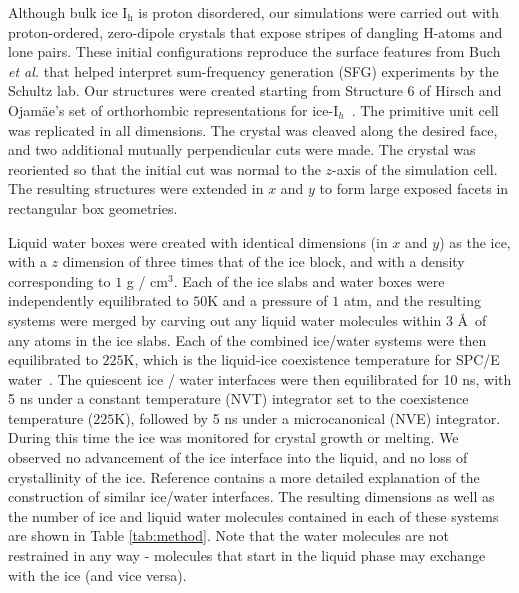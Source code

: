 Although bulk ice I$_\mathrm{h}$ is proton disordered, our simulations
were carried out with proton-ordered, zero-dipole crystals that expose
stripes of dangling H-atoms and lone pairs.  These initial
configurations reproduce the surface features from Buch \textit{et
  al.}\cite{Buch2008} that helped interpret sum-frequency generation
(SFG) experiments by the Schultz lab.\cite{Groenzin07} Our structures were
created starting from Structure 6 of Hirsch and Ojam\"{a}e's set of
orthorhombic representations for ice-I$_{h}$~\cite{Hirsch2004}. The
primitive unit cell was replicated in all dimensions. The crystal was
cleaved along the desired face, and two additional mutually
perpendicular cuts were made.  The crystal was reoriented so that the
initial cut was normal to the $z$-axis of the simulation cell.  The
resulting structures were extended in $x$ and $y$ to form large
exposed facets in rectangular box geometries.

Liquid water boxes were created with identical dimensions (in $x$ and
$y$) as the ice, with a $z$ dimension of three times that of the ice
block, and with a density corresponding to $1$ g / cm$^3$.  Each of
the ice slabs and water boxes were independently equilibrated to $50$K
and a pressure of $1$ atm, and the resulting systems were merged by
carving out any liquid water molecules within 3 \AA\ of any atoms in
the ice slabs.  Each of the combined ice/water systems were then
equilibrated to $225$K, which is the liquid-ice coexistence
temperature for SPC/E water~\cite{Bryk2002}. The quiescent ice / water
interfaces were then equilibrated for 10 ns, with 5 ns under a
constant temperature (NVT) integrator set to the coexistence
temperature ($225$K), followed by 5 ns under a microcanonical (NVE)
integrator.  During this time the ice was monitored for crystal growth
or melting. We observed no advancement of the ice interface into the
liquid, and no loss of crystallinity of the ice. Reference
 contains a more detailed explanation of the
construction of similar ice/water interfaces. The resulting dimensions
as well as the number of ice and liquid water molecules contained in
each of these systems are shown in Table \ref{tab:method}.  Note that
the water molecules are not restrained in any way - molecules that
start in the liquid phase may exchange with the ice (and vice versa).

